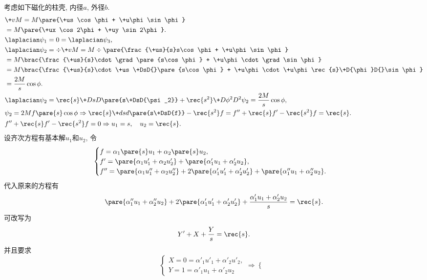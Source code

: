 \documentclass[hidelinks]{ctexart}
\begin{document}
\begin{sample}
    \begin{ex}
        考虑如下磁化的柱壳, 内径$a$, 外径$b$.
        \begin{align*}
            & \+vM = M\pare{\+us \cos\phi + \+u\phi \sin \phi} \\
            & = M \pare{\+ux \cos 2\phi + \+uy \sin 2\phi}. \\
            & \laplacian \psi_1 = 0 = \laplacian \psi_3, \\
            & \laplacian \psi_2 = \div \+vM = M\div \pare{\frac{\+us}{s}s\cos\phi + \+u\phi \sin\phi} \\
            &= M\brac{\frac{\+us}{s}\cdot \grad \pare{s\cos\phi} + \+u\phi \cdot \grad \sin\phi} \\
            &= M\brac{\frac{\+us}{s}\cdot \+us \+DsD{}\pare{s\cos\phi} + \+u\phi \cdot \+u\phi \rec{s}\+D{\phi}D{}\sin \phi} \\
            &= \frac{2M}{s}\cos\phi. \\
            & \laplacian \psi_2  = \rec{s}\+DsD{}\pare{s\+DsD{\psi_2}} + \rec{s^2}\+D{\phi^2}D{^2\psi_2} = \frac{2M}{s}\cos \phi, \\
            & \psi_2 = 2Mf\pare{s}\cos\phi \Rightarrow \rec{s}\+dsd{}\pare{s\+DsD{f}} - \rec{s^2} f = f'' + \rec{s}f' - \rec{s^2}f = \rec{s}. \\
            & f'' + \rec{s}f' - \rec{s^2}f = 0 \Rightarrow u_1 = s, \quad u_2 = \rec{s}.
        \end{align*}
        设齐次方程有基本解$u_1$和$u_2$, 令
        \[ \begin{cases}
            f = \alpha_1\pare{s} u_1 + \alpha_2\pare{s} u_2, \\
            f' = \pare{\alpha_1 u'_1 + \alpha_2 u'_2} + \pare{\alpha'_1 u_1 + \alpha'_2 u_2}, \\
            f'' = \pare{\alpha_1 u''_1 + \alpha_2 u''_2} + 2\pare{\alpha'_1 u'_1 + \alpha'_2 u'_2} + \pare{\alpha''_1 u_1 + \alpha''_2 u_2}.
        \end{cases} \]
        代入原来的方程有
        \[ \pare{\alpha''_1 u_1 + \alpha''_2 u_2} + 2\pare{\alpha'_1 u'_1 + \alpha'_2 u'_2} + \frac{\alpha'_1 u_1 + \alpha'_2 u_2}{s} = \rec{s}. \]
        可改写为
        \[ Y' + X + \frac{Y}{s} = \rec{s}. \]
        并且要求
        \[ \begin{cases}
            X = 0 = \alpha'_1 u'_1 + \alpha'_2 u'_2, \\
            Y = 1 = \alpha'_1 u_1 + \alpha'_2 u_2
        \end{cases} \Rightarrow \begin{cases}

\end{cases}\]
\end{ex}
\end{sample}
\end{document}
